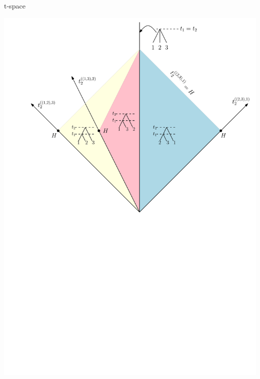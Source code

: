 \documentclass{beamer}
\renewcommand{\t}{$\mathrm{t}$}
\begin{document}
\begin{frame}{\t-space}
\begin{definition}
\begin{center}
\includegraphics[width=0.78\framewidth]{tSpace2d}
\end{center}
\end{definition}
\end{frame}
\end{document}
